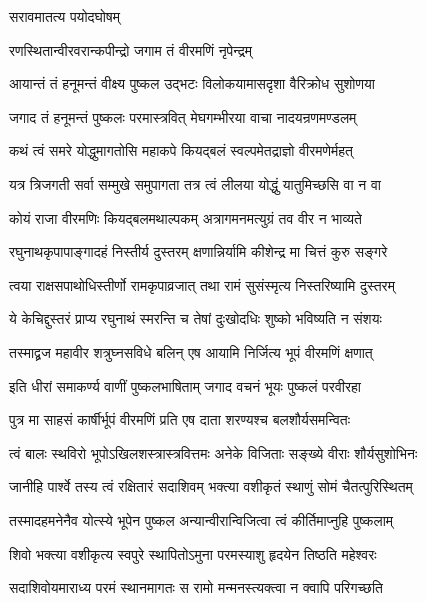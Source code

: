 सरावमातत्य पयोदघोषम्

\twolineshloka
{रणस्थितान्वीरवरान्कपीन्द्रो}
{जगाम तं वीरमणिं नृपेन्द्रम्}%

\twolineshloka
{आयान्तं तं हनूमन्तं वीक्ष्य पुष्कल उद्भटः}
{विलोकयामासदृशा वैरिक्रोध सुशोणया}%

\twolineshloka
{जगाद तं हनूमन्तं पुष्कलः परमास्त्रवित्}
{मेघगम्भीरया वाचा नादयन्रणमण्डलम्}%


\twolineshloka
{कथं त्वं समरे योद्धुमागतोसि महाकपे}
{कियद्बलं स्वल्पमेतद्राज्ञो वीरमणेर्महत्}%

\twolineshloka
{यत्र त्रिजगती सर्वा सम्मुखे समुपागता}
{तत्र त्वं लीलया योद्धुं यातुमिच्छसि वा न वा}%

\twolineshloka
{कोयं राजा वीरमणिः कियद्बलमथाल्पकम्}
{अत्रागमनमत्युग्रं तव वीर न भाव्यते}%

\twolineshloka
{रघुनाथकृपापाङ्गादहं निस्तीर्य दुस्तरम्}
{क्षणान्निर्यामि कीशेन्द्र मा चित्तं कुरु सङ्गरे}%

\twolineshloka
{त्वया राक्षसपाथोधिस्तीर्णो रामकृपाव्रजात्}
{तथा रामं सुसंस्मृत्य निस्तरिष्यामि दुस्तरम्}%

\twolineshloka
{ये केचिद्दुस्तरं प्राप्य रघुनाथं स्मरन्ति च}
{तेषां दुःखोदधिः शुष्को भविष्यति न संशयः}%

\twolineshloka
{तस्माद्व्रज महावीर शत्रुघ्नसविधे बलिन्}
{एष आयामि निर्जित्य भूपं वीरमणिं क्षणात्}%


\twolineshloka
{इति धीरां समाकर्ण्य वाणीं पुष्कलभाषिताम्}
{जगाद वचनं भूयः पुष्कलं परवीरहा}%


\twolineshloka
{पुत्र मा साहसं कार्षीर्भूपं वीरमणिं प्रति}
{एष दाता शरण्यश्च बलशौर्यसमन्वितः}%

\twolineshloka
{त्वं बालः स्थविरो भूपोऽखिलशस्त्रास्त्रवित्तमः}
{अनेके विजिताः सङ्ख्ये वीराः शौर्यसुशोभिनः}%

\twolineshloka
{जानीहि पार्श्वे तस्य त्वं रक्षितारं सदाशिवम्}
{भक्त्या वशीकृतं स्थाणुं सोमं चैतत्पुरिस्थितम्}%

\twolineshloka
{तस्मादहमनेनैव योत्स्ये भूपेन पुष्कल}
{अन्यान्वीरान्विजित्वा त्वं कीर्तिमाप्नुहि पुष्कलाम्}%


\twolineshloka
{शिवो भक्त्या वशीकृत्य स्वपुरे स्थापितोऽमुना}
{परमस्याशु हृदयेन तिष्ठति महेश्वरः}%

\twolineshloka
{सदाशिवोयमाराध्य परमं स्थानमागतः}
{स रामो मन्मनस्त्यक्त्वा न क्वापि परिगच्छति}%

